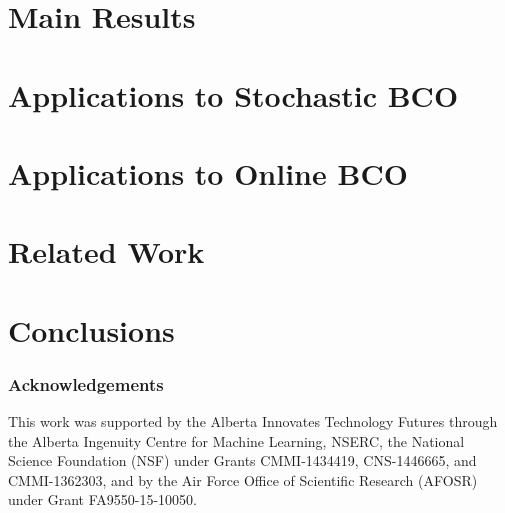 \documentclass[twoside]{article}
\begin{document}
\section{Main Results}
\label{sec:results}


\section{Applications to Stochastic BCO}
\label{sec:sbco}


\section{Applications to Online BCO}
\label{sec:obco}


\section{Related Work}
\label{sec:related}


%

\section{Conclusions}
\label{sec:conc}


\subsubsection*{Acknowledgements}
This work was supported by the Alberta Innovates Technology Futures through the Alberta Ingenuity Centre for Machine Learning, NSERC, the National Science Foundation (NSF) under Grants CMMI-1434419, CNS-1446665, and CMMI-1362303, and by the Air Force Office of Scientific Research (AFOSR) under Grant FA9550-15-10050.





\clearpage\newpage
\onecolumn
\appendix

\end{document}

